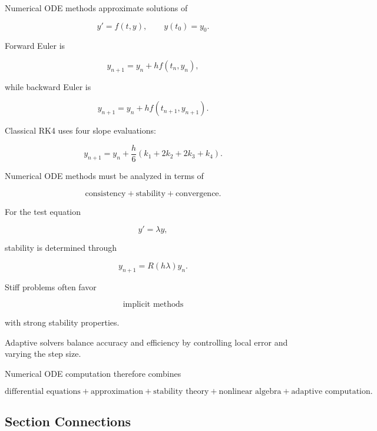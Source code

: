 Numerical ODE methods approximate solutions of

\[
\boxed{
y'=f(t,y),
\qquad
y(t_0)=y_0.
}
\]

Forward Euler is

\[
\boxed{
y_{n+1}
=
y_n
+
hf(t_n,y_n),
}
\]

while backward Euler is

\[
\boxed{
y_{n+1}
=
y_n
+
hf(t_{n+1},y_{n+1}).
}
\]

Classical RK4 uses four slope evaluations:

\[
\boxed{
y_{n+1}
=
y_n
+
\frac{h}{6}
(
k_1+2k_2+2k_3+k_4
).
}
\]

Numerical ODE methods must be analyzed in terms of

\[
\boxed{
\text{consistency}
+
\text{stability}
+
\text{convergence}.
}
\]

For the test equation

\[
y'=\lambda y,
\]

stability is determined through

\[
\boxed{
y_{n+1}
=
R(h\lambda)y_n.
}
\]

Stiff problems often favor

\[
\boxed{
\text{implicit methods}
}
\]

with strong stability properties.

Adaptive solvers balance accuracy and efficiency by controlling local error
and varying the step size.

Numerical ODE computation therefore combines

\[
\boxed{
\text{differential equations}
+
\text{approximation}
+
\text{stability theory}
+
\text{nonlinear algebra}
+
\text{adaptive computation}.
}
\]

\subsection{Section Connections}
\label{subsec:numerical-ode-connections}


